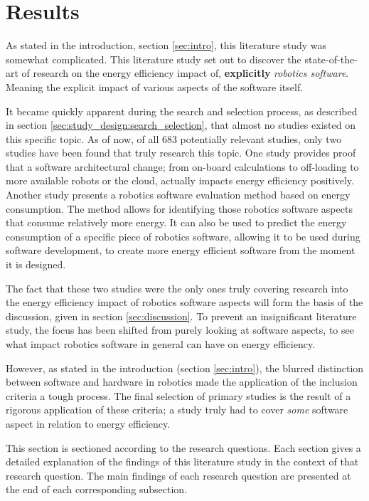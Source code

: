 \section{Results}
\label{sec:results}
As stated in the introduction, section \ref{sec:intro}, this literature study was somewhat complicated.
This literature study set out to discover the state-of-the-art of research on the energy efficiency impact of, \textbf{explicitly} \textit{robotics software}.
Meaning the explicit impact of various aspects of the software itself.

It became quickly apparent during the search and selection process, as described in section \ref{sec:study_design:search_selection}, 
that almost no studies existed on this specific topic.
As of now, of all 683 potentially relevant studies, only two studies have been found that truly research this topic.
One study \cite{rahman2019cloud_robot_offloading} provides proof that a software architectural change; 
from on-board calculations to off-loading to more available robots or the cloud, actually impacts energy efficiency positively.
Another study \cite{hou2017novel_cloud_evaluation_model} presents a robotics software evaluation method based on energy consumption.
The method allows for identifying those robotics software aspects that consume relatively more energy. 
It can also be used to predict the energy consumption of a specific piece of robotics software, allowing it to be used during software development, 
to create more energy efficient software from the moment it is designed.

The fact that these two studies were the only ones truly covering research into the energy efficiency impact of robotics software aspects will
form the basis of the discussion, given in section \ref{sec:discussion}.
To prevent an insignificant literature study, the focus has been shifted from purely looking at software aspects, to see what impact 
robotics software in general can have on energy efficiency.

However, as stated in the introduction (section \ref{sec:intro}), the blurred distinction between software and hardware in robotics made the 
application of the inclusion criteria a tough process.
The final selection of primary studies is the result of a rigorous application of these criteria; 
a study truly had to cover \textit{some} software aspect in relation to energy efficiency.

\vspace{5mm}

This section is sectioned according to the research questions.
Each section gives a detailed explanation of the findings of this literature study in the context of that research question.
The main findings of each research question are presented at the end of each corresponding subsection.


